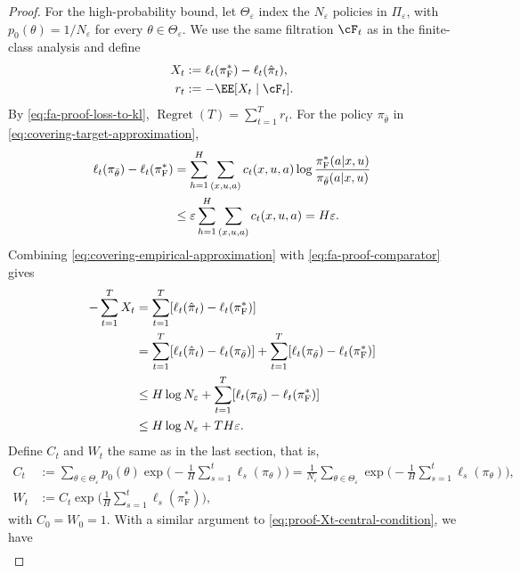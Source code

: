 \documentclass[11pt]{article}
\newcommand{\pif}{\pi_{\mathrm{F}}}
\begin{document}
\begin{proof}
For the high-probability bound, let $\Theta_\varepsilon$ index the $N_\varepsilon$ policies
in $\Pi_\varepsilon$, with
$p_0(\theta)=1/N_\varepsilon$ for every
$\theta\in\Theta_\varepsilon$.
We use the same filtration $\cF_t$ as in the finite-class
analysis and define
\begin{align*}
    X_t
    &:=
    \ell_t(\pif^*)-\ell_t(\hat\pi_t),\\
    r_t
    &:=
    -\EE[X_t\mid\cF_t].
\end{align*}
By \eqref{eq:fa-proof-loss-to-kl},
$\operatorname{Regret}(T)=\sum_{t=1}^T r_t$. For the policy $\pi_{\bar\theta}$ in
\eqref{eq:covering-target-approximation},
\begin{align}
    \ell_t(\pi_{\bar\theta})-\ell_t(\pif^*)
    &=
    \sum_{h=1}^H\sum_{(x,u,a)}
    c_t(x,u,a)
    \log\frac{\pif^*(a|x,u)}
             {\pi_{\bar\theta}(a|x,u)}
    \notag\\
    &\leq
    \varepsilon
    \sum_{h=1}^H\sum_{(x,u,a)}c_t(x,u,a)
    =
    H\varepsilon.
    \label{eq:covering-empirical-approximation}
\end{align}
Combining \eqref{eq:covering-empirical-approximation} with
\eqref{eq:fa-proof-comparator} gives
\begin{align}
    -\sum_{t=1}^T X_t
    &=
    \sum_{t=1}^T
    [\ell_t(\hat\pi_t)-\ell_t(\pif^*)]
    \notag\\\notag
    &=\sum_{t=1}^T
    [\ell_t(\hat\pi_t)-\ell_t(\pi_{\bar \theta})]+
    \sum_{t=1}^T
    [\ell_t(\pi_{\bar\theta})-\ell_t(\pif^*)]\\
    &\leq
    H\log N_\varepsilon
    +
    \sum_{t=1}^T
    [\ell_t(\pi_{\bar\theta})-\ell_t(\pif^*)]
    \notag\\
    &\leq
    H\log N_\varepsilon+TH\varepsilon.
    \label{eq:covering-empirical-bound}
\end{align}
Define $C_t$ and $W_t$ the same as in the last section, that is,
\begin{align*}
    C_t
    &:=
    \sum_{\theta\in\Theta_\varepsilon}p_0(\theta)
    \exp\bigg(
        -\frac1H\sum_{s=1}^t\ell_s(\pi_\theta)
    \bigg)=\frac{1}{N_\varepsilon}\sum_{\theta\in\Theta_\varepsilon}
    \exp\bigg(
        -\frac1H\sum_{s=1}^t\ell_s(\pi_\theta)
    \bigg),\\
    W_t
    &:=
    C_t\exp\bigg(
        \frac1H\sum_{s=1}^t\ell_s(\pif^*)
    \bigg),
\end{align*}
with $C_0=W_0=1$. With a similar argument to
\eqref{eq:proof-Xt-central-condition}, we have 
\begin{align}

\end{align}
\end{proof}
\end{document}
